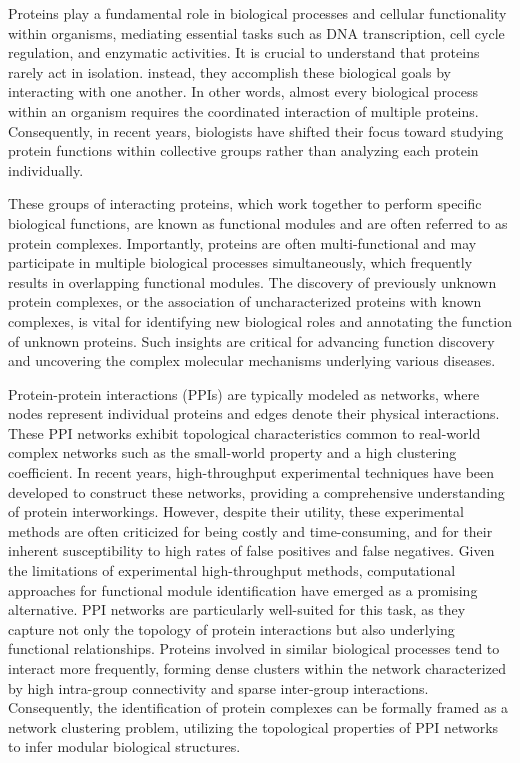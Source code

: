 Proteins play a fundamental role in biological processes and cellular functionality within organisms, mediating essential tasks such as DNA transcription, cell cycle regulation, and enzymatic activities. It is crucial to understand that proteins rarely act in isolation. instead, they accomplish these biological goals by interacting with one another. In other words, almost every biological process within an organism requires the coordinated interaction of multiple proteins. Consequently, in recent years, biologists have shifted their focus toward studying protein functions within collective groups rather than analyzing each protein individually.

These groups of interacting proteins, which work together to perform specific biological functions, are known as functional modules and are often referred to as protein complexes. Importantly, proteins are often multi-functional and may participate in multiple biological processes simultaneously, which frequently results in overlapping functional modules. The discovery of previously unknown protein complexes, or the association of uncharacterized proteins with known complexes, is vital for identifying new biological roles and annotating the function of unknown proteins. Such insights are critical for advancing function discovery and uncovering the complex molecular mechanisms underlying various diseases. 

Protein-protein interactions (PPIs) are typically modeled as networks, where nodes represent individual proteins and edges denote their physical interactions. These PPI networks exhibit topological characteristics common to real-world complex networks such as the small-world property and a high clustering coefficient. In recent years, high-throughput experimental techniques have been developed to construct these networks, providing a comprehensive understanding of protein interworkings. However, despite their utility, these experimental methods are often criticized for being costly and time-consuming, and for their inherent susceptibility to high rates of false positives and false negatives. Given the limitations of experimental high-throughput methods, computational approaches for functional module identification have emerged as a promising alternative. PPI networks are particularly well-suited for this task, as they capture not only the topology of protein interactions but also underlying functional relationships. Proteins involved in similar biological processes tend to interact more frequently, forming dense clusters within the network characterized by high intra-group connectivity and sparse inter-group interactions. Consequently, the identification of protein complexes can be formally framed as a network clustering problem, utilizing the topological properties of PPI networks to infer modular biological structures.

